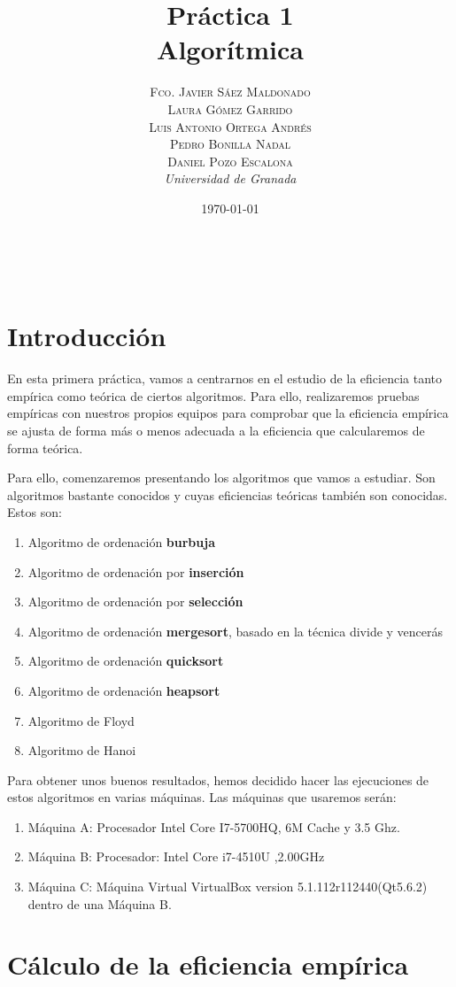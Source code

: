 \documentclass[a4paper, 11pt]{article}
\title{\textbf{Práctica 1}\\ %
Algorítmica} %
\author{\textsc{Fco. Javier Sáez Maldonado}\\ %
\textsc{Laura Gómez Garrido}\\
\textsc{Luis Antonio Ortega Andrés}\\
\textsc{Pedro Bonilla Nadal}\\
\textsc{Daniel Pozo Escalona}\vspace{2cm}
\\{\textit{Universidad de Granada}}} %
\date{\today} %
\makeatletter
\renewcommand{\maketitle}{
  \begin{flushright} %
  
  {\LARGE\@title} %
  
  \vspace{50pt} %
  
  {\large\@author} %
  \\\@date %
  \vspace{40pt} %
  \end{flushright}
}
\makeatother
\begin{document}
\maketitle %


{\parskip=2pt
  \tableofcontents
}
\pagebreak



\section*{Introducción}

En esta primera práctica, vamos a centrarnos en el estudio de la eficiencia tanto empírica como teórica de ciertos algoritmos. Para ello, realizaremos pruebas empíricas con nuestros propios equipos para comprobar que la eficiencia empírica se ajusta de forma más o menos adecuada a la eficiencia que calcularemos de forma teórica.

Para ello, comenzaremos presentando los algoritmos que vamos a estudiar. Son algoritmos bastante conocidos y cuyas eficiencias teóricas también son conocidas. Estos son:
\begin{enumerate}
	\item Algoritmo de ordenación \textbf{burbuja}
	\item Algoritmo de ordenación por \textbf{inserción}
	\item Algoritmo de ordenación por \textbf{selección}
	\item Algoritmo de ordenación \textbf{mergesort}, basado en la técnica divide y vencerás
	\item Algoritmo de ordenación \textbf{quicksort}
	\item Algoritmo de ordenación \textbf{heapsort}
	\item Algoritmo de Floyd
	\item Algoritmo de Hanoi
\end{enumerate}

Para obtener unos buenos resultados, hemos decidido hacer las ejecuciones de estos algoritmos en varias máquinas. Las máquinas que usaremos serán:
\begin{enumerate}    
	\item Máquina A: Procesador Intel Core I7-5700HQ, 6M Cache y 3.5 Ghz.
	\item Máquina B: Procesador: Intel Core i7-4510U ,2.00GHz
	\item Máquina C: Máquina Virtual VirtualBox version 5.1.112r112440(Qt5.6.2) dentro de una Máquina B.

\end{enumerate}

\section{Cálculo de la eficiencia empírica}
\end{document}
